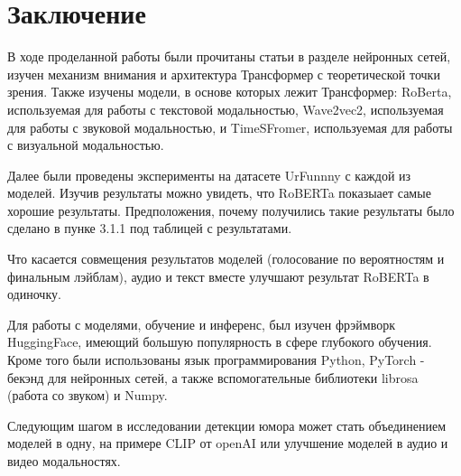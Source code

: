 \documentclass[PMI,KR]{HSEUniversity}
\begin{document}
\chapter{Заключение}

В ходе проделанной работы были прочитаны статьи в разделе нейронных сетей, изучен механизм внимания и архитектура Трансформер с теоретической точки зрения. Также изучены модели, в основе которых лежит Трансформер: RoBerta, используемая для работы с текстовой модальностью, Wave2vec2, используемая для работы с звуковой модальностью, и TimeSFromer, используемая для работы с визуальной модальностью. 

Далее были проведены эксперименты  на датасете UrFunnny с каждой из моделей. Изучив результаты можно увидеть, что RoBERTa показыает самые хорошие результаты. Предположения, почему получились такие результаты было сделано в пунке 3.1.1 под таблицей с результатами.

Что касается совмещения результатов моделей (голосование по вероятностям и финальным лэйблам), аудио и текст вместе улучшают результат RoBERTa в одиночку.

Для работы с моделями, обучение и инференс, был изучен фрэймворк HuggingFace, имеющий большую популярность в сфере глубокого обучения. Кроме того были использованы язык программирования Python, PyTorch - бекэнд для нейронных сетей, а также вспомогательные библиотеки librosa (работа со звуком) и Numpy.

Следующим шагом в исследовании детекции юмора может стать объединением моделей в одну, на примере CLIP от openAI или улучшение моделей в аудио и видео модальностях.




\putbibliography %
\end{document}
